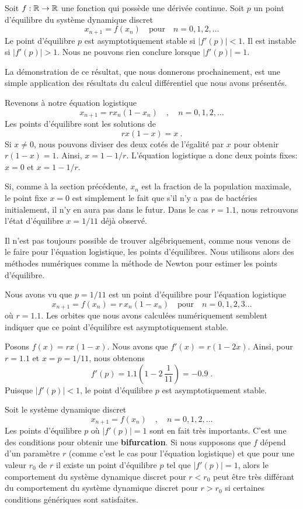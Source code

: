 {\begin{theorem} \label{sdd_stab_th}
Soit $f:\mathbb{R} \to \mathbb{R}$ une fonction qui possède une dérivée continue.
Soit $p$ un point d'équilibre du système dynamique discret
\[
x_{n+1}=f(x_n) \quad \text{pour} \quad n=0, 1, 2, \ldots
\]
Le point d'équilibre $p$ est asymptotiquement stable si
$|f'(p)| < 1$.  Il est instable si $|f'(p)|>1$.  Nous ne pouvons rien
conclure lorsque $|f'(p)|=1$.
\end{theorem}

La démonstration de ce résultat, que nous donnerons prochainement, est
une simple application des résultats du calcul différentiel que nous
avons présentés.

Revenons à notre équation logistique
\[
x_{n+1} = r x_n (1-x_n) \quad , \quad n=0,1,2,\ldots
\]
Les points d'équilibre sont les solutions de
\[
r x (1-x) = x \ .
\]
Si $x\neq 0$, nous pouvons diviser des deux cotés de l'égalité par $x$ pour
obtenir $r (1-x)=1$.  Ainsi, $x = 1 - 1/r$.  L'équation logistique a
donc deux points fixes: $x=0$ et $x=1-1/r$.

Si, comme à la section précédente, $x_n$ est la fraction de la
population maximale, le point fixe $x=0$ est simplement le fait que
s'il n'y a pas de bactéries initialement, il n'y en aura pas dans le
futur.   Dans le cas $r=1.1$, nous retrouvons l'état d'équilibre $x=1/11$
déjà observé.

Il n'est pas toujours possible de trouver algébriquement, comme nous
venons de le faire pour l'équation logistique, les points
d'équilibres.  Nous utilisons alors des méthodes numériques comme la
méthode de Newton pour estimer les points d'équilibre.

\begin{egg}
Nous avons vu que $p= 1/11$ est un point d'équilibre pour l'équation
logistique
\[
x_{n+1} = f(x_n) = r\, x_n (1-x_n) \quad \text{pour} \quad n=0, 1, 2, 3 \ldots
\]
où $r=1.1$.  Les orbites que nous avons calculées numériquement semblent
indiquer que ce point d'équilibre est asymptotiquement stable.

Posons $f(x) = r x (1-x)$.  Nous avons que $f'(x) = r(1-2x)$.  Ainsi, pour
$r=1.1$ et $x = p = 1/11$, nous obtenons
\[
f'(p) = 1.1 \left( 1 - 2\,\frac{1}{11}\right) = -0.9 \; .
\]
Puisque $|f'(p)|<1$, le point d'équilibre $p$ est asymptotiquement
stable.
\end{egg}

\begin{rmk}
Soit le système dynamique discret
\[
x_{n+1} = f(x_n) \quad , \quad n=0, 1, 2, \ldots
\]
Les points d'équilibre $p$ où $|f'(p)|=1$ sont en fait très
importants.  C'est une des conditions pour obtenir une
{\bfseries bifurcation}.  Si nous supposons que $f$ dépend d'un paramètre
$r$ (comme c'est le cas pour l'équation logistique) et que pour une
valeur $r_0$ de $r$ il existe un point d'équilibre $p$ tel que
$|f'(p)|=1$, alors le comportement du système dynamique discret pour
$r<r_0$ peut être très différant du comportement du système dynamique
discret pour $r>r_0$ si certaines conditions génériques sont
satisfaites.


\end{rmk}}
